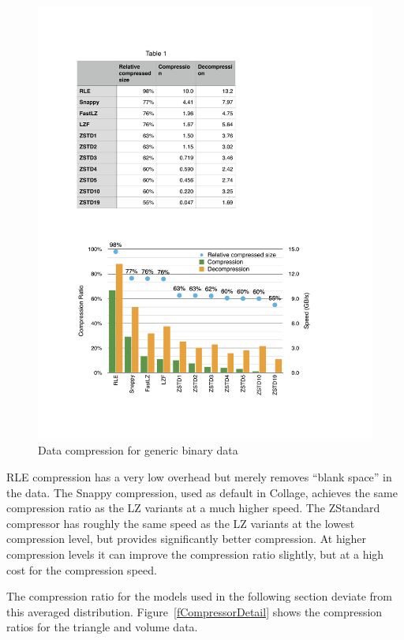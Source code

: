 \documentclass[10pt,journal,compsoc]{IEEEtran}
\newcommand{\fig}[1]{Figure~\ref{#1}}
\begin{document}
\begin{figure}[ht]\center
  \includegraphics[width=\columnwidth]{images/compressor}
  \caption{\label{fCompressor}Data compression for generic binary data}
\end{figure}

RLE compression has a very low overhead but
merely removes ``blank space'' in the data. The Snappy compression, used as
default in \textsf{Collage}, achieves the same compression ratio as the LZ
variants at a much higher speed. The ZStandard compressor has roughly the same
speed as the LZ variants at the lowest compression level, but provides
significantly better compression. At higher compression levels it can improve
the compression ratio slightly, but at a high cost for the compression speed.

The compression ratio for the models used in the following section deviate from
this averaged distribution. \fig{fCompressorDetail} shows the compression ratios
for the triangle and volume data.
\end{document}
